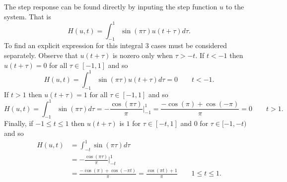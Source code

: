 \begin{excersizelist}
\begin{solution}
\begin{center}
\newcommand{\hgamma}[1]{\draw[smooth,color=black,thick,dashed,domain=-1+(1.0/#1):1,samples=40] plot function{-(#1/pi)*(cos(pi*(x-(1.0/#1)))-cos(pi*x)) };}
\end{center}

The step response can be found directly by inputing the step function $u$ to the system.  That is
\[ 
H(u,t) = \int_{-1}^{1} \sin(\pi\tau) u(t + \tau) d\tau.
\]  
To find an explicit expression for this integral 3 cases must be considered separately.  Observe that $u(t + \tau)$ is nozero only when $\tau > -t$.  If $t < -1$ then $u(t + \tau) = 0$ for all $\tau \in [-1,1]$ and so
\[
H(u,t) = \int_{-1}^{1} \sin(\pi\tau) u(t + \tau) d\tau = 0 \qquad t < -1.
\] 
If $t > 1$ then $u(t + \tau) = 1$ for all $\tau \in [-1,1]$ and so
\[
H(u,t) = \int_{-1}^{1} \sin(\pi\tau) d\tau = -\frac{\cos(\pi\tau)}{\pi} \big\vert_{-1}^1 = \frac{-\cos(\pi) + \cos(-\pi)}{\pi} = 0 \qquad t > 1.
\]
Finally, if $-1 \leq t \leq 1$ then $u(t + \tau)$ is $1$ for $\tau \in [-t,1]$ and $0$ for $\tau \in [-1,-t)$ and so
\begin{align*}
H(u,t) &= \int_{-t}^{1} \sin(\pi\tau) d\tau \\
&= -\frac{\cos(\pi\tau)}{\pi} \big\vert_{-t}^1 \\
&= \frac{-\cos(\pi) + \cos(-\pi t)}{\pi} = \frac{\cos(\pi t) + 1}{\pi} \qquad 1 \leq t \leq 1.
\end{align*}


\end{solution}
\end{excersizelist}
